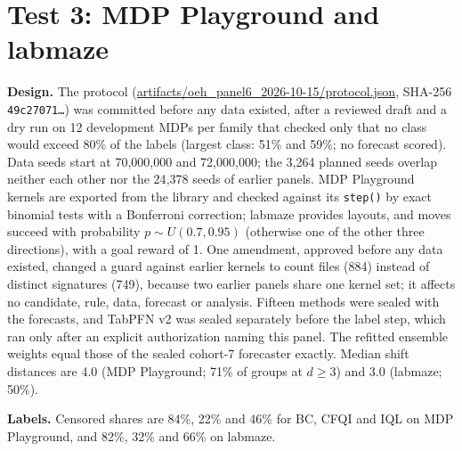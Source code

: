 \section{Test 3: MDP Playground and labmaze}
\label{supp:panel6}
\textbf{Design.} The protocol (\url{artifacts/oeh_panel6_2026-10-15/protocol.json}, SHA-256 \texttt{49c27071\ldots}) was committed before any data existed, after a reviewed draft and a dry run on 12 development MDPs per family that checked only that no class would exceed 80\% of the labels (largest class: 51\% and 59\%; no forecast scored). Data seeds start at 70{,}000{,}000 and 72{,}000{,}000; the 3{,}264 planned seeds overlap neither each other nor the 24{,}378 seeds of earlier panels. MDP Playground kernels are exported from the library and checked against its \texttt{step()} by exact binomial tests with a Bonferroni correction; labmaze provides layouts, and moves succeed with probability $p\sim U(0.7,0.95)$ (otherwise one of the other three directions), with a goal reward of 1. One amendment, approved before any data existed, changed a guard against earlier kernels to count files (884) instead of distinct signatures (749), because two earlier panels share one kernel set; it affects no candidate, rule, data, forecast or analysis. Fifteen methods were sealed with the forecasts, and TabPFN v2 was sealed separately before the label step, which ran only after an explicit authorization naming this panel. The refitted ensemble weights equal those of the sealed cohort-7 forecaster exactly. Median shift distances are 4.0 (MDP Playground; 71\% of groups at $d\ge3$) and 3.0 (labmaze; 50\%).

\textbf{Labels.} Censored shares are 84\%, 22\% and 46\% for BC, CFQI and IQL on MDP Playground, and 82\%, 32\% and 66\% on labmaze.

\begin{table}[t]
\centering
\caption{Test 3 by learner (IBS; lower is better; best per row in bold).}
\label{tab:panel6-learner}
\footnotesize
\setlength{\tabcolsep}{2pt}
\end{table}

